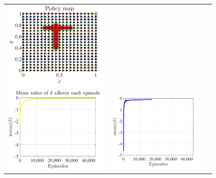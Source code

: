 \documentclass[preprint,12pt,authoryear]{elsarticle}
\begin{document}
\begin{figure}[t]
\begin{center}
\begin{tabular}[h]{ccc}
\includegraphics[scale=0.30]{figures/puddleWorld-kwta-policy.pdf}    \\
\includegraphics[scale=0.30]{figures/puddleWorld-linear-delta.pdf}   &
\includegraphics[scale=0.30]{figures/puddleWorld-bp-delta.pdf}       &

\end{tabular}
\end{center}
\end{figure}
\end{document}
